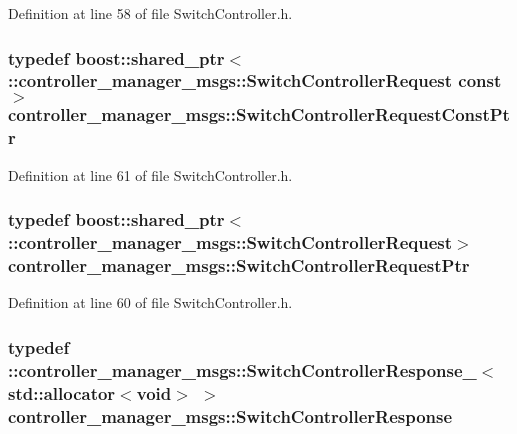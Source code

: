 \-Definition at line 58 of file \-Switch\-Controller.\-h.

\subsubsection[{\-Switch\-Controller\-Request\-Const\-Ptr}]{\setlength{\rightskip}{0pt plus 5cm}typedef boost\-::shared\-\_\-ptr$<$ \-::{\bf controller\-\_\-manager\-\_\-msgs\-::\-Switch\-Controller\-Request} const$>$ {\bf controller\-\_\-manager\-\_\-msgs\-::\-Switch\-Controller\-Request\-Const\-Ptr}}\label{namespacecontroller__manager__msgs_add20d082d6e5bc3e02e6f3b67e49913f}


\-Definition at line 61 of file \-Switch\-Controller.\-h.

\subsubsection[{\-Switch\-Controller\-Request\-Ptr}]{\setlength{\rightskip}{0pt plus 5cm}typedef boost\-::shared\-\_\-ptr$<$ \-::{\bf controller\-\_\-manager\-\_\-msgs\-::\-Switch\-Controller\-Request}$>$ {\bf controller\-\_\-manager\-\_\-msgs\-::\-Switch\-Controller\-Request\-Ptr}}\label{namespacecontroller__manager__msgs_aca253a4889294bcdcb921dc20106a25d}


\-Definition at line 60 of file \-Switch\-Controller.\-h.

\subsubsection[{\-Switch\-Controller\-Response}]{\setlength{\rightskip}{0pt plus 5cm}typedef \-::{\bf controller\-\_\-manager\-\_\-msgs\-::\-Switch\-Controller\-Response\-\_\-}$<$std\-::allocator$<$void$>$ $>$ {\bf controller\-\_\-manager\-\_\-msgs\-::\-Switch\-Controller\-Response}}\label{namespacecontroller__manager__msgs_aa6c4a990ae7dffc1fd95794beb5fe77d}


